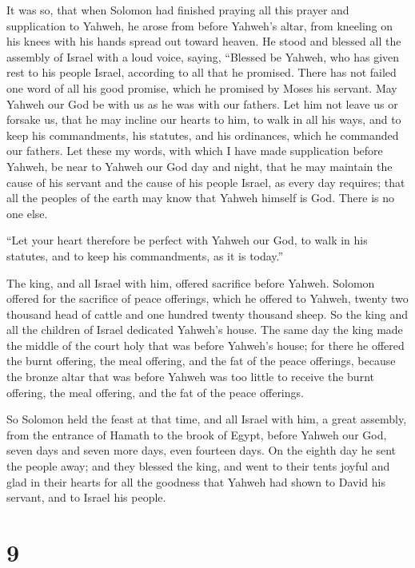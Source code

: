  It was so, that when Solomon had finished praying all
this prayer and supplication to Yahweh, he arose from before Yahweh's
altar, from kneeling on his knees with his hands spread out toward
heaven.  He stood and blessed all the assembly of Israel
with a loud voice, saying,  ``Blessed be Yahweh, who has
given rest to his people Israel, according to all that he promised.
There has not failed one word of all his good promise, which he promised
by Moses his servant.  May Yahweh our God be with us as
he was with our fathers. Let him not leave us or forsake us,
 that he may incline our hearts to him, to walk in all
his ways, and to keep his commandments, his statutes, and his
ordinances, which he commanded our fathers.  Let these my
words, with which I have made supplication before Yahweh, be near to
Yahweh our God day and night, that he may maintain the cause of his
servant and the cause of his people Israel, as every day requires;
 that all the peoples of the earth may know that Yahweh
himself is God. There is no one else.

 ``Let your heart therefore be perfect with Yahweh our
God, to walk in his statutes, and to keep his commandments, as it is
today.''

 The king, and all Israel with him, offered sacrifice
before Yahweh.  Solomon offered for the sacrifice of
peace offerings, which he offered to Yahweh, twenty two thousand head of
cattle and one hundred twenty thousand sheep. So the king and all the
children of Israel dedicated Yahweh's house.  The same
day the king made the middle of the court holy that was before Yahweh's
house; for there he offered the burnt offering, the meal offering, and
the fat of the peace offerings, because the bronze altar that was before
Yahweh was too little to receive the burnt offering, the meal offering,
and the fat of the peace offerings.

 So Solomon held the feast at that time, and all Israel
with him, a great assembly, from the entrance of Hamath to the brook of
Egypt, before Yahweh our God, seven days and seven more days, even
fourteen days.  On the eighth day he sent the people
away; and they blessed the king, and went to their tents joyful and glad
in their hearts for all the goodness that Yahweh had shown to David his
servant, and to Israel his people.

\hypertarget{section-8}{%
\section{9}\label{section-8}}

